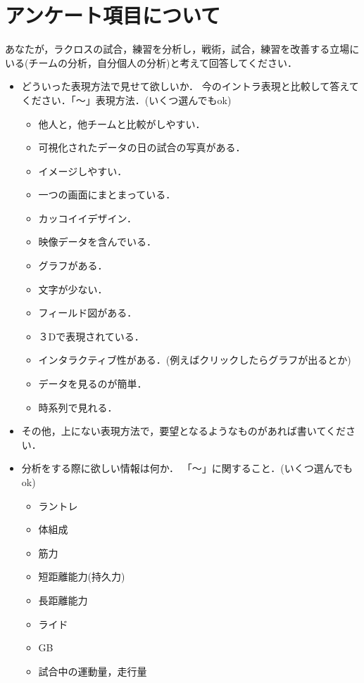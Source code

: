 \documentclass[sotsuron]{kuee}
\begin{document}
\appendix
\chapter{アンケート項目について}
	あなたが，ラクロスの試合，練習を分析し，戦術，試合，練習を改善する立場にいる(チームの分析，自分個人の分析)と考えて回答してください．
	\begin{itemize}
		\item どういった表現方法で見せて欲しいか．
			今のイントラ表現と比較して答えてください．「〜」表現方法．(いくつ選んでもok)
			\begin{itemize}
				\item 他人と，他チームと比較がしやすい．
				\item 可視化されたデータの日の試合の写真がある．
				\item イメージしやすい．
				\item 一つの画面にまとまっている．
				\item カッコイイデザイン．
				\item 映像データを含んでいる．
				\item グラフがある．
				\item 文字が少ない．
				\item フィールド図がある．
				\item ３Dで表現されている．
				\item インタラクティブ性がある．(例えばクリックしたらグラフが出るとか)
				\item データを見るのが簡単．
				\item 時系列で見れる．
			\end{itemize}
		\item その他，上にない表現方法で，要望となるようなものがあれば書いてください．
		\item 分析をする際に欲しい情報は何か．
			「〜」に関すること．(いくつ選んでもok)
			\begin{itemize}
				\item ラントレ
				\item 体組成
				\item 筋力
				\item 短距離能力(持久力)
				\item 長距離能力
				\item ライド
				\item GB
				\item 試合中の運動量，走行量

\end{itemize}
\end{itemize}
\end{document}

